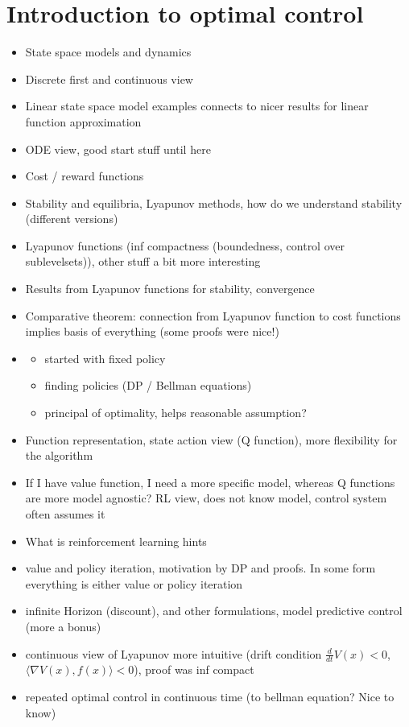 \section{Introduction to optimal control}
\begin{itemize}
    \item State space models and dynamics 
    \item Discrete first and continuous view
    \item Linear state space model examples connects to nicer results for linear function approximation
    \item ODE view,  good start stuff until here 
    \item Cost / reward functions  
    \item Stability and equilibria, Lyapunov methods, how do we understand stability (different versions) 
    \item Lyapunov functions (inf compactness (boundedness, control over sublevelsets)), other stuff a bit more interesting
    \item Results from Lyapunov functions for stability, convergence 
    \item Comparative theorem: connection from Lyapunov function to cost functions implies basis of everything (some proofs were nice!)
    \item \begin{itemize}
        \item started with fixed policy 
        \item finding policies (DP / Bellman equations)
        \item principal of optimality, helps reasonable assumption?  
    \end{itemize}
    \item Function representation, state action view (Q function), more flexibility for the algorithm
    \item If I have value function, I need a more specific model, whereas Q functions are more model agnostic? RL view, does not know model, control system often assumes it
    \item What is reinforcement learning hints 
    \item value and policy iteration, motivation by DP and proofs. In some form everything is either value or policy iteration 
    \item infinite Horizon (discount), and other formulations, model predictive control (more a bonus)
    \item continuous view of Lyapunov more intuitive (drift condition \(\frac{d}{dt} V(x)<0\), \(\langle \nabla V(x),f(x)\rangle<0\)), proof was inf compact 
    \item repeated optimal control in continuous time (to bellman equation? Nice to know) 
\end{itemize}

